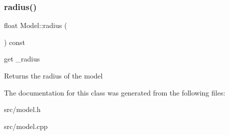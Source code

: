 \subsubsection{\texorpdfstring{radius()}{radius()}}
{\footnotesize\ttfamily float Model\+::radius (\begin{DoxyParamCaption}{ }\end{DoxyParamCaption}) const}



get \+\_\+radius 

\begin{DoxyReturn}{Returns}
the radius of the model 
\end{DoxyReturn}


The documentation for this class was generated from the following files\+:\begin{DoxyCompactItemize}
\item 
src/model.\+h\item 
src/model.\+cpp\end{DoxyCompactItemize}
